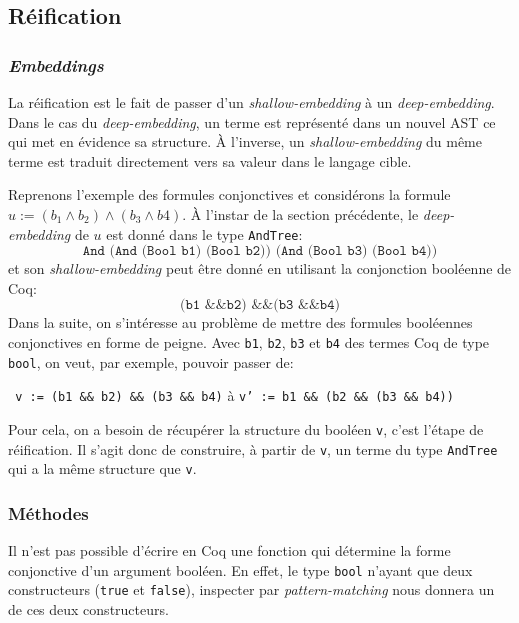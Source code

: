 \documentclass[11pt]{article}
\begin{document}
\subsection{Réification} \label{reification}

\subsubsection{\textit{Embeddings}}

La réification est le fait de passer d'un \textit{shallow-embedding} à un \textit{deep-embedding}. Dans le cas du \textit{deep-embedding}, un terme est représenté dans un nouvel AST ce qui met en évidence sa structure. À l'inverse, un \textit{shallow-embedding} du même terme est traduit directement vers sa valeur dans le langage cible. \medbreak

Reprenons l'exemple des formules conjonctives et considérons la formule $ u := (b_1 \wedge b_2) \wedge (b_3 \wedge b4)$. À l'instar de la section précédente, le \textit{deep-embedding} de $u$ est donné dans le type \texttt{AndTree}:
\[\texttt{And (And (Bool b1) (Bool b2)) (And (Bool b3) (Bool b4))}\] 
et son \textit{shallow-embedding} peut être donné en utilisant la conjonction booléenne de Coq: 
\[\texttt{(b1 \&\& b2) \&\& (b3 \&\& b4)} \]
Dans la suite, on s'intéresse au problème de mettre des formules booléennes conjonctives en forme de peigne. Avec \texttt{b1}, \texttt{b2}, \texttt{b3} et \texttt{b4} des termes Coq de type \texttt{bool}, on veut, par exemple, pouvoir passer de: 
\begin{center}
\texttt{ v := (b1 \&\& b2) \&\& (b3 \&\& b4)}  \hspace{.5cm} à   \hspace{.5cm}  \texttt{v' := b1 \&\& (b2 \&\& (b3 \&\& b4))}
\end{center}
Pour cela, on a besoin de récupérer la structure du booléen \texttt{v}, c'est l'étape de réification. Il s'agit donc de construire, à partir de \texttt{v}, un terme du type \texttt{AndTree} qui a la même structure que \texttt{v}.

\subsubsection{Méthodes}

Il n'est pas possible d'écrire en Coq une fonction qui détermine la forme conjonctive d'un argument booléen. En effet, le type \texttt{bool} n'ayant que deux constructeurs (\texttt{true} et \texttt{false}), inspecter par \textit{pattern-matching} nous donnera un de ces deux constructeurs.\medbreak
\end{document}
